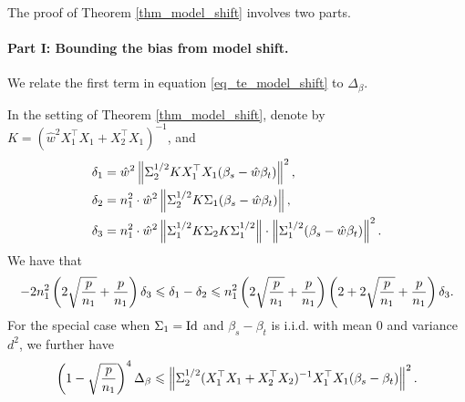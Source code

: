The proof of Theorem \ref{thm_model_shift} involves two parts.

\paragraph{Part I: Bounding the bias from model shift.}
We relate the first term in equation \eqref{eq_te_model_shift} to $\Delta_{\beta}$.
\begin{proposition}\label{prop_model_shift}
	In the setting of Theorem \ref{thm_model_shift},
	denote by $K = (\hat{w}^2X_1^{\top}X_1 + X_2^{\top}X_1)^{-1}$, and
	\begin{align*}
		\delta_1 &= \hat{w}^2 \left\| \Sigma_2^{1/2} K X_1^{\top}X_1(\beta_s - \hat{w}\beta_t) \right\|^2, \\
		\delta_2 &= n_1^2\cdot \hat{w}^2 \left\| \Sigma_2^{1/2}K\Sigma_1(\beta_s - \hat{w}\beta_t) \right\|, \\
		\delta_3 &= n_1^2\cdot \hat{w}^2 \left\| \Sigma_1^{1/2} K \Sigma_2 K \Sigma_1^{1/2} \right\| \cdot \left\| \Sigma_1^{1/2} (\beta_s - \hat{w}\beta_t) \right\|^2.
	\end{align*}
	We have that
	\begin{align*}
		-2n_1^2\left({{2\sqrt{\frac{p}{n_1}}} + {\frac{p}{n_1}}}\right) \delta_3
		\leqslant  \delta_1 - \delta_2
		\leqslant n_1^2\left({2\sqrt{\frac{p}{n_1}} + \frac{p}{n_1}}\right)\left({2 + 2\sqrt{\frac{p}{n_1}} + \frac{p}{n_1}}\right)\delta_3.
	\end{align*}
	For the special case when $\Sigma_1 = \operatorname{Id}$ and $\beta_s - \beta_t$ is i.i.d. with mean $0$ and variance $d^2$, we further have
	\begin{align*}
		\left({1 - \sqrt{\frac{p}{n_1}}}\right)^4 \Delta_{\beta}
		\leqslant \left\| \Sigma_2^{1/2} (X_1^{\top}X_1 + X_2^{\top}X_2)^{-1}X_1^{\top}X_1(\beta_s - \beta_t) \right\|^2.
	\end{align*}
\end{proposition}


